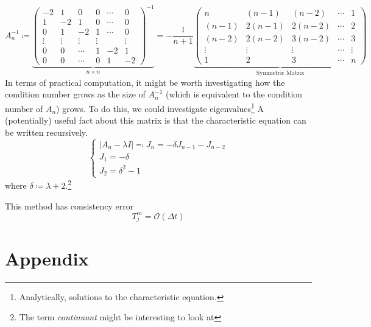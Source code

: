 \documentclass[a4paper]{article}
\theoremstyle{definition}
\begin{document}
\begin{equation}
    A_n^{-1} \coloneqq
    \underbrace{
    \begin{pmatrix}
        -2 & 1 & 0 & 0 & \cdots & 0 \\
        1 & -2 & 1 & 0 & \cdots & 0 \\
        0 & 1 & -2 & 1 & \cdots & 0 \\
        \vdots & \vdots & \vdots & \vdots & & \vdots \\
        0 & 0 & \cdots & 1 & -2 & 1 \\
        0 & 0 & \cdots & 0 & 1 & -2
    \end{pmatrix}^{-1}
}_{n \times n}
= -\frac{1}{n+1}
\underbrace{
\begin{pmatrix}
    n & (n-1) & (n-2) & \cdots & 1 \\
    (n-1) & 2(n-1) & 2(n-2) & \cdots & 2 \\
    (n-2) & 2(n-2) & 3(n-2) & \cdots & 3 \\
    \vdots & \vdots & \vdots & \cdots & \vdots \\
    1 & 2 & 3 & \cdots & n
\end{pmatrix}
}_{\text{Symmetric Matrix}}
\end{equation}
In terms of practical computation, it might be worth investigating how the condition number grows as the size of $A_n^{-1}$ (which is equivalent to the condition number of $A_n$) grows.
To do this, we could investigate eigenvalues\footnote{Analytically, solutions to the characteristic equation.}
A (potentially) useful fact about this matrix is that the characteristic equation can be written recursively.
\begin{equation}
    \begin{cases}
        |A_n - \lambda I|\eqqcolon J_n = -\delta J_{n-1} - J_{n-2} \\
        J_1 = -\delta \\
        J_{2} = \delta^2 - 1
    \end{cases}
\end{equation}
where $\delta \coloneqq \lambda + 2$.\footnote{The term \emph{continuant} might be interesting to look at}

This method has consistency error
\begin{equation}
    T_j^m = \mathcal{O}\left( \Delta t \right)
    \label{H2 Consistency Error}
\end{equation}


\newpage
\section{Appendix}
\end{document}
